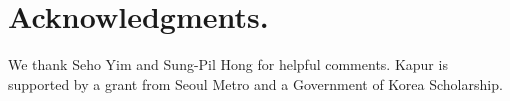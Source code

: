 \documentclass[moor]{informs1}              %
\let\loweredsection\section
\renewcommand{\section}[1]{\loweredsection{#1.}}
\begin{document}
\let\section\loweredsection
\section*{Acknowledgments.}
We thank Seho Yim and Sung-Pil Hong for helpful comments. Kapur is supported by a grant from Seoul Metro and a Government of Korea Scholarship.



\end{document}
